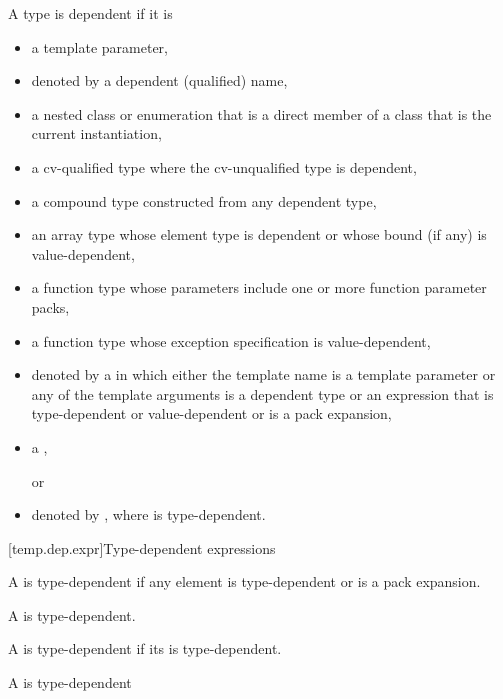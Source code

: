 \documentclass{wg21}
\begin{document}
\pnum
A type is dependent if it is
\begin{itemize}
	\item
	a template parameter,
	\item
	denoted by a dependent (qualified) name,
	\item
	a nested class or enumeration that is a direct member of
	a class that is the current instantiation,
	\item
	a cv-qualified type where the cv-unqualified type is dependent,
	\item
	a compound type constructed from any dependent type,
	\item
	an array type whose element type is dependent or whose
	bound (if any) is value-dependent,
	\item
	a function type whose parameters include one or more function parameter packs,
	\item
	a function type whose exception specification is value-dependent,
	\item
	denoted by a 
	in which either the template name is a template parameter or any of the
	template arguments is a dependent type or an expression that is type-dependent
	or value-dependent or is a pack expansion,
    \item a ,
	or
	\item denoted by \tcode{)},
	where  is type-dependent.
\end{itemize}

[temp.dep.expr]{Type-dependent expressions}


\pnum
A  is type-dependent if any element is
type-dependent or is a pack expansion.

\pnum
A  is type-dependent.

	\pnum
A  is type-dependent if its  is type-dependent.

\begin{addedblock}
A  is type-dependent
\end{addedblock}
\end{document}
